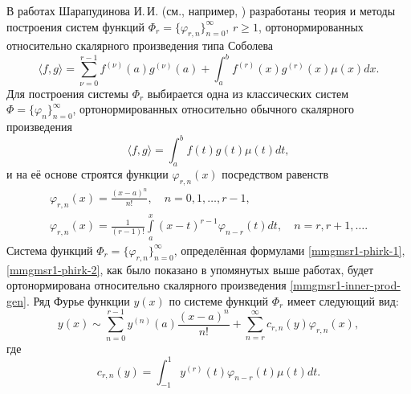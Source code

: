\Introduction

В работах Шарапудинова И.\,И. (см., например, \cite{mmgmsr1-Sha18, mmgmsr1-Shii-Shti-izvvuzov2017, mmgmsr1-Shii-matzam2017, mmgmsr1-ShaGadGad16, mmgmsr1-ShaGad16, mmgmsr1-Shii-lag-demi2015, mmgmsr1-SHII-MMG-Demi2015}) разработаны теория и методы построения систем функций $\Phi_r=\{\varphi_{r,n}\}_{n=0}^\infty$, $r \ge 1$, ортонормированных относительно скалярного произведения типа Соболева
\begin{equation}\label{mmgmsr1-inner-prod-gen}
\langle f,g \rangle =
\sum_{\nu=0}^{r-1}f^{(\nu)}(a)g^{(\nu)}(a)+\int_{a}^{b}f^{(r)}(x)g^{(r)}(x)\mu(x)dx.
\end{equation}
Для построения системы $\Phi_r$ выбирается одна из классических систем $\Phi =\{\varphi_n\}_{n=0}^\infty$, ортонормированных относительно обычного скалярного произведения
\begin{equation}\label{mmgmsr1-classic-mul}
\langle f,g \rangle =\int_{a}^{b}f(t)g(t)\mu(t)dt,
\end{equation}
и на её основе строятся функции $\varphi_{r,n}(x)$ посредством равенств
\begin{gather}
\label{mmgmsr1-phirk-1}
\varphi_{r,n}(x) =\frac{(x-a)^n}{n!}, \quad n=0,1,\ldots, r-1,\\
\label{mmgmsr1-phirk-2}
\varphi_{r,n}(x) =\frac{1}{(r-1)!}\int\limits_{a}^x(x-t)^{r-1}\varphi_{n-r}(t)dt, \quad n=r,r+1,\ldots.
\end{gather}
Система функций $\Phi_r=\{\varphi_{r,n}\}_{n=0}^\infty$, определённая формулами \eqref{mmgmsr1-phirk-1}, \eqref{mmgmsr1-phirk-2}, как было показано в упомянутых выше работах, будет ортонормирована относительно скалярного произведения \eqref{mmgmsr1-inner-prod-gen}.
Ряд Фурье функции $y(x)$ по системе функций $\Phi_r$ имеет следующий вид:
\begin{equation}\label{mmgmsr1-fourier-series}
y(x) \sim \sum_{n=0}^{r-1} y^{(n)}(a)\frac{(x-a)^n}{n!}+ \sum_{n=r}^\infty c_{r,n}(y) \varphi_{r,n}(x),
\end{equation}
где
\begin{equation}\label{mmgmsr1-crk}
c_{r,n}(y)=\int_{-1}^1 y^{(r)}(t)\varphi_{n-r}(t)\mu(t)dt.
\end{equation}


